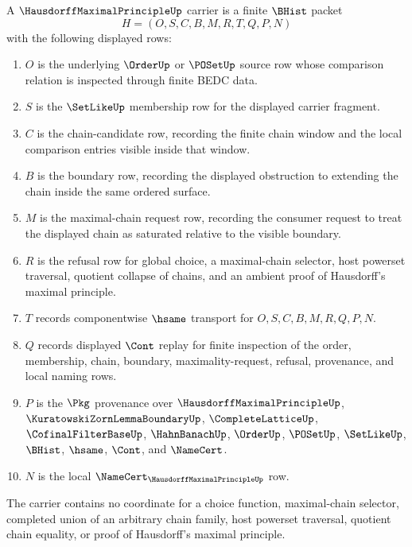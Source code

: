 \begin{definition}
\label{def:hausdorff-maximal-principle-carrier}
A $\HausdorffMaximalPrincipleUp$ carrier is a finite $\BHist$ packet
$$
H=(O,S,C,B,M,R,T,Q,P,N)
$$
with the following displayed rows:
\begin{enumerate}
\item $O$ is the underlying $\OrderUp$ or $\POSetUp$ source row whose comparison relation is inspected through finite BEDC data.
\item $S$ is the $\SetLikeUp$ membership row for the displayed carrier fragment.
\item $C$ is the chain-candidate row, recording the finite chain window and the local comparison entries visible inside that window.
\item $B$ is the boundary row, recording the displayed obstruction to extending the chain inside the same ordered surface.
\item $M$ is the maximal-chain request row, recording the consumer request to treat the displayed chain as saturated relative to the visible boundary.
\item $R$ is the refusal row for global choice, a maximal-chain selector, host powerset traversal, quotient collapse of chains, and an ambient proof of Hausdorff's maximal principle.
\item $T$ records componentwise $\hsame$ transport for $O,S,C,B,M,R,Q,P,N$.
\item $Q$ records displayed $\Cont$ replay for finite inspection of the order, membership, chain, boundary, maximality-request, refusal, provenance, and local naming rows.
\item $P$ is the $\Pkg$ provenance over $\HausdorffMaximalPrincipleUp$, $\KuratowskiZornLemmaBoundaryUp$, $\CompleteLatticeUp$, $\CofinalFilterBaseUp$, $\HahnBanachUp$, $\OrderUp$, $\POSetUp$, $\SetLikeUp$, $\BHist$, $\hsame$, $\Cont$, and $\NameCert$.
\item $N$ is the local $\NameCert_{\HausdorffMaximalPrincipleUp}$ row.
\end{enumerate}
The carrier contains no coordinate for a choice function, maximal-chain selector, completed union of an arbitrary chain family, host powerset traversal, quotient chain equality, or proof of Hausdorff's maximal principle.
\end{definition}

